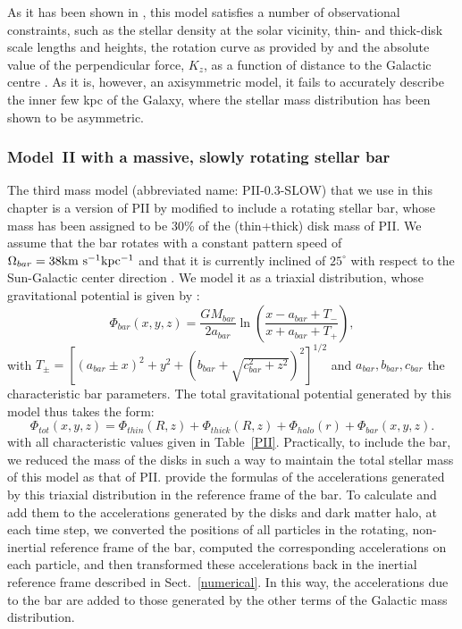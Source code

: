         As it has been shown in \citet{2017A&A...598A..66P}, this model satisfies a number of observational constraints, such as the stellar density at the solar vicinity, thin- and thick-disk scale lengths and heights, the rotation curve as provided by \citet{2014ApJ...783..130R}  and the absolute value of the perpendicular force, $K_z$, as a function of distance to the Galactic centre \citep[see Sect.~2.5 in][]{2017A&A...598A..66P}. As it is, however, an axisymmetric model, it fails to  accurately describe the inner few kpc of the Galaxy, where the stellar mass distribution has been shown to be asymmetric.     

    \subsubsection{Model~II with a massive, slowly rotating stellar bar}
        The third mass model (abbreviated name: PII-0.3-SLOW)  that we use in this chapter is a version of PII by \citet{2017A&A...598A..66P} modified to include a rotating stellar bar, whose mass has been assigned to be 30\% of the (thin+thick) disk mass of PII. We assume that the bar rotates with a constant pattern speed of $\Omega_{bar}=38\rm km~s^{-1}kpc^{-1}$ and that it is currently inclined of $25^\circ$ with respect to the Sun-Galactic center direction \citep[see][]{2016ARA&A..54..529B}. We model it as a triaxial distribution, whose gravitational potential is given by  \citet{1992ApJ...397...44L}:
        \begin{equation}
            \Phi_{bar}(x,y,z)=\frac{GM_{bar}}{2a_{bar}}\ln\left( \frac{x-a_{bar}+T_{-}}{x+a_{bar}+T_{+}}   \right),
        \end{equation}
        with $T_{\pm}=\left[ (a_{bar}\pm x)^2+ y^2 +  (b_{bar}+ \sqrt{c_{bar}^2+z^2})^2 \right]^{1/2}$
        and $a_{bar}, b_{bar}, c_{bar}$ the characteristic bar parameters. The total gravitational potential generated by this model thus takes the form:
        \begin{equation}
            \Phi_{tot}(x, y, z) = \Phi_{thin}(R, z) + \Phi_{thick}(R, z) + \Phi_{halo}(r)+  \Phi_{bar}(x, y, z).
        \end{equation}
        with all characteristic values given in Table~\ref{PII}. Practically, to include the bar, we reduced the mass of the disks in such a way to maintain the total stellar mass of this model as that of PII.  \citet{1992ApJ...397...44L} provide the formulas of the accelerations generated by this triaxial distribution in the reference frame of the bar. To calculate and add them to the accelerations generated by the disks and dark matter halo, at each time step, we converted the positions of all particles  in the rotating, non-inertial reference frame of the bar, computed the corresponding accelerations on each particle, and then transformed these accelerations back in the inertial reference frame described in Sect.~\ref{numerical}. In this way, the accelerations due to the bar are added to those generated by the other terms of the Galactic mass distribution. 


